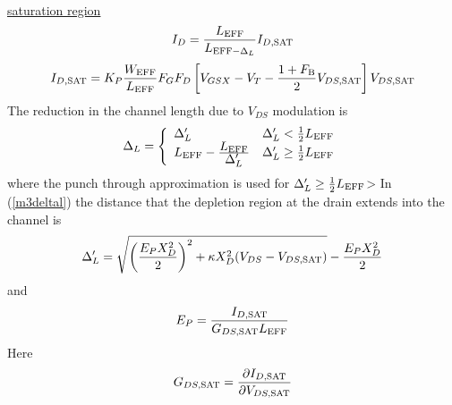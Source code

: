 \\[0.2in]
%
%
\underline{saturation region}
\begin{equation}
I_{D} = {{L_{\mbox{\scriptsize EFF}}}\over{\textstyle L_{\mbox{\scriptsize EFF}-\Delta_L}}} I_{D,\mbox{\scriptsize SAT}}
      \label{mos3satids}
\end{equation}
\begin{equation}
I_{D,\mbox{\scriptsize SAT}}  =   K_P {{W_{\mbox{\scriptsize EFF}}}\over{ L_{\mbox{\scriptsize EFF}}}} F_G F_D
           \left[ V_{GSX} - V_T - {{1 + F_{\mbox{\scriptsize B}}}\over 2} V_{DS,\mbox{\scriptsize SAT}}
	   \right] V_{DS,\mbox{\scriptsize SAT}}
\end{equation}
The reduction in the channel length due to $V_{DS}$ modulation is
\begin{equation}
\Delta_L = \left\{ \begin{array}{ll}
            \Delta'_L    & \Delta'_L < \frac{1}{2} L_{\ms{EFF}}\\
            L_{\ms{EFF}} - {{\textstyle L_{\ms{EFF}}} \over
            {\textstyle \Delta'_L}}
			 & \Delta'_L \ge \frac{1}{2} L_{\ms{EFF}}
	    \end{array} \right. %
            \label{m3deltal}
\end{equation}
where the punch through approximation is used for
$\Delta'_L \ge \frac{1}{2} L_{\mbox{\scriptsize EFF}}$>
In (\ref{m3deltal}) the distance that the depletion region at the drain
extends into the channel is
\begin{equation}
\Delta'_L = \sqrt{ \left( {{E_PX_D^2} \over 2}\right)^2
                           + \kappa X_D^2(V_{DS} - V_{DS,\mbox{\scriptsize SAT}})}
		    - {{E_PX_D^2}\over2}
\end{equation}
and
\begin{equation}
E_P = {{I_{D,\mbox{\scriptsize SAT}}}\over{G_{DS,\mbox{\scriptsize SAT}}L_{\mbox{\scriptsize EFF}}}}
\end{equation}
Here
\begin{equation}
G_{DS,\mbox{\scriptsize SAT}} = {{\partial I_{D,\mbox{\scriptsize SAT}}}\over{\partial V_{DS,\mbox{\scriptsize SAT}}}}
\end{equation}
